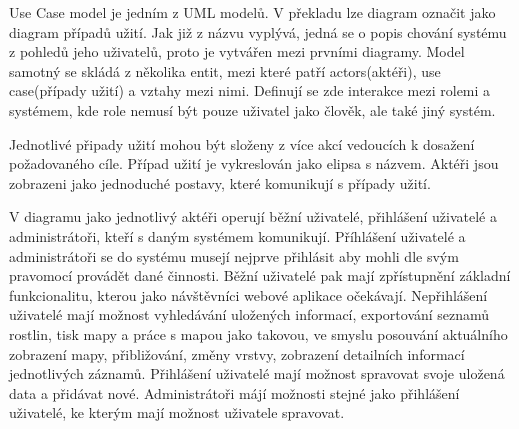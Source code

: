 \documentclass[12pt]{article}%
\begin{document}
{{
Use Case model je jedním z UML modelů. V překladu lze diagram označit jako diagram případů užití. 
Jak již z názvu vyplývá, jedná se o popis chování systému z pohledů jeho uživatelů, proto je 
vytvářen mezi prvními diagramy. Model samotný se skládá z několika entit, mezi které patří 
actors(aktéři),  use case(případy užití) a vztahy mezi nimi. Definují se zde interakce mezi rolemi 
a systémem, kde role nemusí být pouze uživatel jako člověk, ale také jiný systém.

Jednotlivé připady užití mohou být složeny z více akcí vedoucích k dosažení požadovaného cíle. 
Případ užití je vykreslován jako elipsa s názvem. Aktéři jsou zobrazeni jako jednoduché postavy, 
které komunikují s případy užití. 

V diagramu jako jednotlivý aktéři operují běžní uživatelé, přihlášení uživatelé a administrátoři, 
kteří s daným systémem komunikují. Příhlášení uživatelé a administrátoři se do systému musejí 
nejprve přihlásit aby mohli dle svým pravomocí provádět dané činnosti. Běžní uživatelé pak mají 
zpřístupnění základní funkcionalitu, kterou jako návštěvníci webové aplikace očekávají. Nepřihlášení 
uživatelé mají možnost vyhledávání uložených informací, exportování seznamů rostlin, tisk mapy 
a práce s mapou jako takovou, ve smyslu posouvání aktuálního zobrazení mapy, přibližování, změny 
vrstvy, zobrazení detailních informací jednotlivých záznamů. Přihlášení uživatelé mají možnost 
spravovat svoje uložená data a přidávat nové. Administrátoři májí možnosti stejné jako přihlášení 
uživatelé, ke kterým mají možnost uživatele spravovat. 
\obrazek
{}

}}
\end{document}
